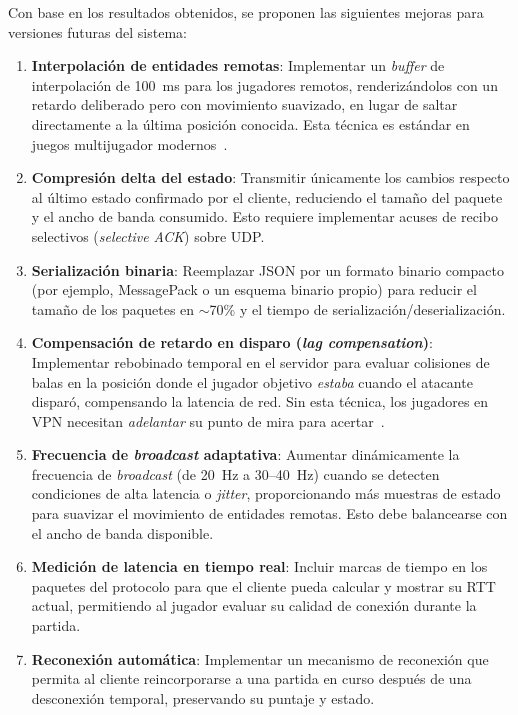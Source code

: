 \documentclass[conference]{IEEEtran}
\begin{document}
Con base en los resultados obtenidos, se proponen las siguientes mejoras para versiones futuras del sistema:

\begin{enumerate}
    \item \textbf{Interpolaci\'on de entidades remotas}: Implementar un \textit{buffer} de interpolaci\'on de 100~ms para los jugadores remotos, renderiz\'andolos con un retardo deliberado pero con movimiento suavizado, en lugar de saltar directamente a la \'ultima posici\'on conocida. Esta t\'ecnica es est\'andar en juegos multijugador modernos~\cite{gambetta2018}.

    \item \textbf{Compresi\'on delta del estado}: Transmitir \'unicamente los cambios respecto al \'ultimo estado confirmado por el cliente, reduciendo el tama\~no del paquete y el ancho de banda consumido. Esto requiere implementar acuses de recibo selectivos (\textit{selective ACK}) sobre UDP.

    \item \textbf{Serializaci\'on binaria}: Reemplazar JSON por un formato binario compacto (por ejemplo, MessagePack o un esquema binario propio) para reducir el tama\~no de los paquetes en $\sim$70\% y el tiempo de serializaci\'on/deserializaci\'on.

    \item \textbf{Compensaci\'on de retardo en disparo (\textit{lag compensation})}: Implementar rebobinado temporal en el servidor para evaluar colisiones de balas en la posici\'on donde el jugador objetivo \textit{estaba} cuando el atacante dispar\'o, compensando la latencia de red. Sin esta t\'ecnica, los jugadores en VPN necesitan \textit{adelantar} su punto de mira para acertar~\cite{gambetta2018}.

    \item \textbf{Frecuencia de \textit{broadcast} adaptativa}: Aumentar din\'amicamente la frecuencia de \textit{broadcast} (de 20~Hz a 30--40~Hz) cuando se detecten condiciones de alta latencia o \textit{jitter}, proporcionando m\'as muestras de estado para suavizar el movimiento de entidades remotas. Esto debe balancearse con el ancho de banda disponible.

    \item \textbf{Medici\'on de latencia en tiempo real}: Incluir marcas de tiempo en los paquetes del protocolo para que el cliente pueda calcular y mostrar su RTT actual, permitiendo al jugador evaluar su calidad de conexi\'on durante la partida.

    \item \textbf{Reconexi\'on autom\'atica}: Implementar un mecanismo de reconexi\'on que permita al cliente reincorporarse a una partida en curso despu\'es de una desconexi\'on temporal, preservando su puntaje y estado.
\end{enumerate}
\end{document}
